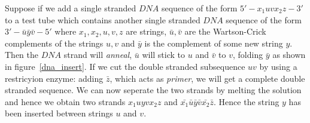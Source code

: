 Suppose if we add a single stranded $DNA$ sequence of the form $5'-x_1uvx_2z-3'$ to a test tube which contains another single stranded $DNA$ 
sequence of the form $3'-\bar{u}\bar{y}\bar{v}-5'$ where $x_1,x_2,u,v,z$ are strings, $\bar{u},\bar{v}$ are the Wartson-Crick complements 
of the strings $u,v$ and $\bar{y}$ is the complement of some new string $y$. Then the $DNA$ strand will \emph{anneal}, $\bar{u}$ will
stick to $u$ and $\bar{v}$ to $v$, folding $\bar{y}$ as shown in figure~\ref{dna_insert}. If we cut the double stranded subsequence $uv$ by using a 
restricyion enzyme: adding $\bar{z}$, which acts as \emph{primer}, we will get a complete double stranded sequence. We can now seperate the two strands 
by melting the solution and hence we obtain two strands $x_1uyvx_2z$ and $\bar{x_1}\bar{u}\bar{y}\bar{v}\bar{x_2}\bar{z}$. Hence the string $y$ has been
inserted between strings $u$ and $v$.

